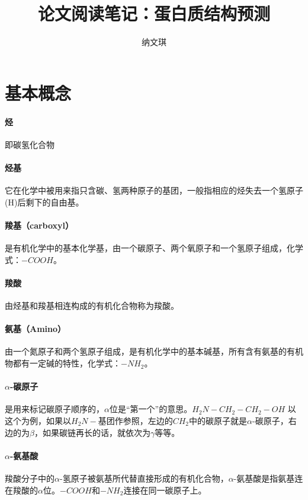 \documentclass[12pt,a4paper]{article}
\begin{document}

\title{论文阅读笔记：蛋白质结构预测}
\author{纳文琪}
\maketitle


\section{基本概念}
\paragraph{烃} 即碳氢化合物

\paragraph{烃基} 它在化学中被用来指只含碳、氢两种原子的基团，一般指相应的烃失去一个氢原子(H)后剩下的自由基。

\paragraph{羧基（carboxyl）} 是有机化学中的基本化学基，由一个碳原子、两个氧原子和一个氢原子组成，化学式：$-COOH$。

\paragraph{羧酸} 由烃基和羧基相连构成的有机化合物称为羧酸。

\paragraph{氨基（Amino）}由一个氮原子和两个氢原子组成，是有机化学中的基本碱基，所有含有氨基的有机物都有一定碱的特性，化学式：$-NH_2$。

\paragraph{$\alpha$-碳原子} 是用来标记碳原子顺序的，$\alpha$位是“第一个”的意思。$H_2N-CH_2-CH_2-OH$ 以这个为例，如果以$H_2N-$基团作参照，左边的$CH_2$中的碳原子就是$\alpha$-碳原子，右边的为$\beta$，如果碳链再长的话，就依次为$\gamma$等等。

\paragraph{$\alpha$-氨基酸} 羧酸分子中的$\alpha$-氢原子被氨基所代替直接形成的有机化合物，$\alpha$-氨基酸是指氨基连在羧酸的$\alpha$位。$-COOH$和$-NH_2$连接在同一碳原子上。
\end{document}
